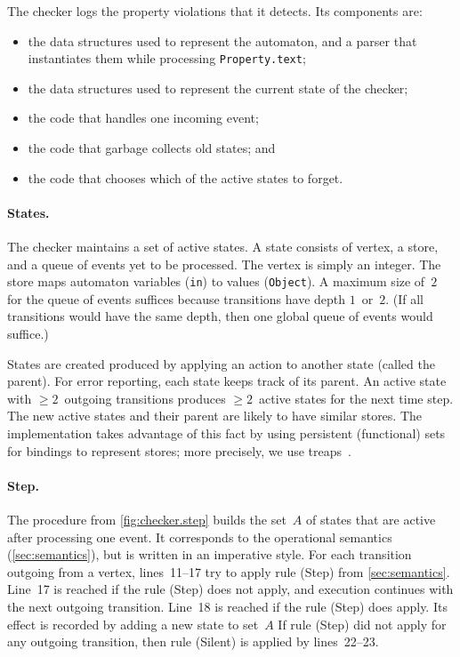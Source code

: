 \documentclass[10pt, preprint]{sigplanconf} %
\begin{document}
The checker logs the property violations that it detects.
Its components are:
\begin{itemize}
\item the data structures used to represent the automaton, and a parser that instantiates them while processing {\tt Property.text};
\item the data structures used to represent the current state of the checker;
\item the code that handles one incoming event;
\item the code that garbage collects old states; and
\item the code that chooses which of the active states to forget.
\end{itemize}

\paragraph{States.}
The checker maintains a set of active states.
A state consists of vertex, a store, and a queue of events yet to be processed.
The vertex is simply an integer.
The store maps automaton variables ({\tt in}) to values ({\tt Object}).
A maximum size of~$2$ for the queue of events suffices because transitions have depth $1$~or~$2$.
(If all transitions would have the same depth, then one global queue of events would suffice.)

States are created produced by applying an action to another state (called the parent).
For error reporting, each state keeps track of its parent.
An active state with $\ge2$~outgoing transitions produces $\ge2$~active states for the next time step.
The new active states and their parent are likely to have similar stores.
The implementation takes advantage of this fact by using persistent (functional) sets for bindings to represent stores; more precisely, we use treaps~\cite{DBLP:conf/focs/AragonS89}.

\paragraph{Step.}

The procedure from \autoref{fig:checker.step} builds the set~$A$ of states that are active after processing one event.
It corresponds to the operational semantics (\autoref{sec:semantics}), but is written in an imperative style.
For each transition outgoing from a vertex, lines~\hbox{11--17} try to apply rule (Step) from \autoref{sec:semantics}.
Line~17 is reached if the rule (Step) does not apply, and execution continues with the next outgoing transition.
Line~18 is reached if the rule (Step) does apply.
Its effect is recorded by adding a new state to set~$A$
If rule (Step) did not apply for any outgoing transition, then rule (Silent) is applied by lines~22--23.
\end{document}
